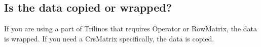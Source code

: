 \documentclass[pdf,12pt,report,strict]{SANDreport}
\begin{document}
\subsection{Is the data copied or wrapped?}
If you are using a part of Trilinos that requires Operator or RowMatrix, the
data is wrapped.  If you need a CrsMatrix specifically, the data is copied.
% 
% 
% 
\end{document}
